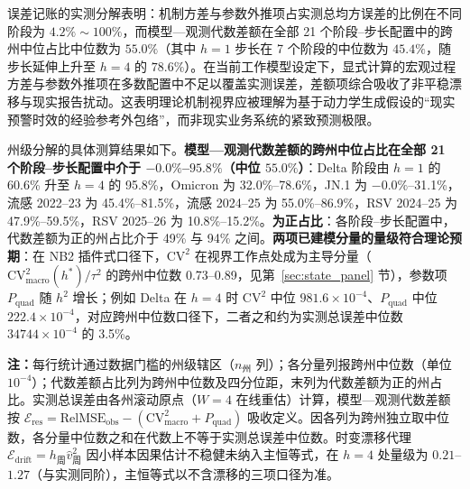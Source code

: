 \documentclass[11pt,a4paper]{article}
\theoremstyle{plain}
\theoremstyle{definition}
\begin{document}
误差记账的实测分解表明：机制方差与参数外推项占实测总均方误差的比例在不同阶段为 $4.2\%\sim 100\%$，而模型—观测代数差额在全部 21 个阶段--步长配置中的跨州中位占比中位数为 $55.0\%$（其中 $h=1$ 步长在 7 个阶段的中位数为 $45.4\%$，随步长延伸上升至 $h=4$ 的 $78.6\%$）。在当前工作模型设定下，显式计算的宏观过程方差与参数外推项在多数配置中不足以覆盖实测误差，差额项综合吸收了非平稳漂移与现实报告扰动。这表明理论机制视界应被理解为基于动力学生成假设的“现实预警时效的经验参考外包络”，而非现实业务系统的紧致预测极限。

州级分解的具体测算结果如下。\textbf{模型—观测代数差额的跨州中位占比在全部 21 个阶段--步长配置中介于 $-0.0\%$--$95.8\%$（中位 $55.0\%$）}：Delta 阶段由 $h=1$ 的 60.6\% 升至 $h=4$ 的 95.8\%，Omicron 为 32.0\%--78.6\%，JN.1 为 $-0.0\%$--31.1\%，流感 2022--23 为 45.4\%--81.5\%，流感 2024--25 为 55.0\%--86.9\%，RSV 2024--25 为 47.9\%--59.5\%，RSV 2025--26 为 10.8\%--15.2\%。\textbf{为正占比}：各阶段--步长配置中，代数差额为正的州占比介于 49\% 与 94\% 之间。\textbf{两项已建模分量的量级符合理论预期}：在 NB2 插件式口径下，$\text{CV}^2$ 在视界工作点处成为主导分量（$\text{CV}^2_{\text{macro}}(h^*)/\tau^2$ 的跨州中位数 0.73--0.89，见第~\ref{sec:state_panel} 节），参数项 $P_{\text{quad}}$ 随 $h^2$ 增长；例如 Delta 在 $h=4$ 时 $\text{CV}^2$ 中位 $981.6\times10^{-4}$、$P_{\text{quad}}$ 中位 $222.4\times10^{-4}$，对应跨州中位数口径下，二者之和约为实测总误差中位数 $34744\times10^{-4}$ 的 3.5\%。

\begin{table}[htbp]
\centering
\footnotesize
\caption{两项显式模型分量与模型—观测代数差额的描述性误差记账州级分解（各分量绝对值 $\times 10^{-4}$ 的中位数与代数差额占比分布）}
\label{tab:budget_four}
\setlength{\tabcolsep}{3pt}%
%
\vspace{2pt}
\begin{flushleft}
\scriptsize \textbf{注：}每行统计通过数据门槛的州级辖区（$n_{\text{州}}$ 列）；各分量列报跨州中位数（单位 $10^{-4}$）；代数差额占比列为跨州中位数及四分位距，末列为代数差额为正的州占比。实测总误差由各州滚动原点（$W=4$ 在线重估）计算，模型—观测代数差额按 $\mathcal{E}_{\text{res}} = \text{RelMSE}_{\text{obs}} - (\text{CV}^2_{\text{macro}} + P_{\text{quad}})$ 吸收定义。因各列为跨州独立取中位数，各分量中位数之和在代数上不等于实测总误差中位数。时变漂移代理 $\mathcal{E}_{\text{drift}} = h_{\text{周}}\widehat{v}^2_{\text{周}}$ 因小样本因果估计不稳健未纳入主恒等式，在 $h=4$ 处量级为 $0.21$--$1.27$（与实测同阶），主恒等式以不含漂移的三项口径为准。\end{flushleft}
\end{table}
\end{document}
